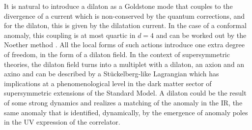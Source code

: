 \documentclass[a4paper,11pt,openright,twoside]{book}
\numberwithin{equation}{section}
\begin{document}
{{It is natural to introduce a dilaton as a Goldstone mode that couples to the divergence of a current which is non-conserved by the quantum corrections, and for the dilaton, this is given by the dilatation current. In the case of a conformal anomaly, this coupling is at most quartic in $d=4$ and can be worked out by the Noether method \cite{Coriano:2013nja,Coriano:2013xua}.
All the local forms of such actions introduce one extra degree of freedom, in the form of a dilaton field. 
In the context of supersymmetric theories, the dilaton field turns into a multiplet with a dilaton, an axion and an 
axino and can be described by a St\"uckelberg-like Lagrangian \cite{Coriano:2010ws} which has implications at a phenomenological level in the dark matter sector of supersymmetric extensions of the Standard Model. 
A dilaton could be the result of some strong dynamics and realizes a matching of the anomaly in the IR, the same anomaly that is identified, dynamically, by the emergence of anomaly poles in the UV expression of the correlator.  

}}
\end{document}
